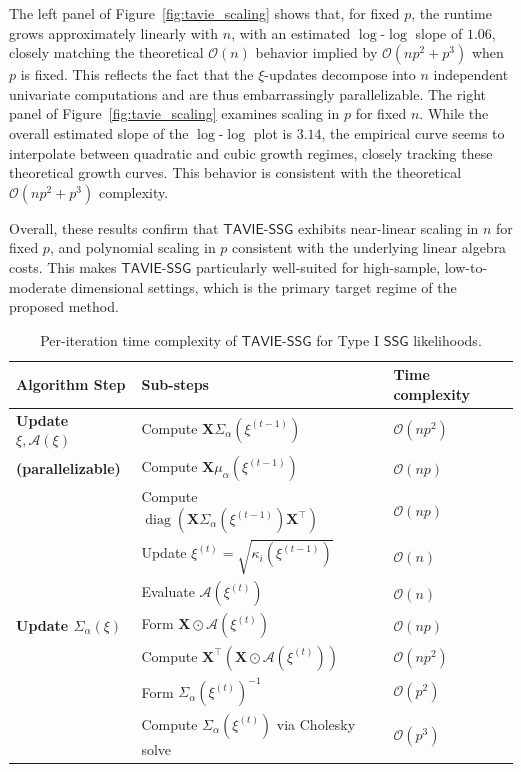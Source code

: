 \documentclass[12pt]{article}
\numberwithin{equation}{section}
\newcommand{\ssg}{\mathsf{SSG}}
\newcommand{\tssg}{\mathsf{TAVIE}\text{-}\mathsf{SSG}}
\begin{document}
{The left panel of Figure~\ref{fig:tavie_scaling} shows that, for fixed $p$, the runtime grows approximately linearly with $n$, with an estimated $\log$-$\log$ slope of $1.06$, closely matching the theoretical $\mathcal{O}(n)$ behavior implied by $\mathcal{O}(np^2 + p^3)$ when $p$ is fixed. This reflects the fact that the $\xi$-updates decompose into $n$ independent univariate computations and are thus embarrassingly parallelizable. The right panel of Figure~\ref{fig:tavie_scaling} examines scaling in $p$ for fixed $n$. While the overall estimated slope of the $\log$-$\log$ plot is $3.14$, the empirical curve seems to interpolate between quadratic and cubic growth regimes, closely tracking these theoretical growth curves. This behavior is consistent with the theoretical $\mathcal{O}(np^2 + p^3)$ complexity.

Overall, these results confirm that $\tssg$ exhibits near-linear scaling in $n$ for fixed $p$, and polynomial scaling in $p$ consistent with the underlying linear algebra costs. This makes $\tssg$ particularly well-suited for high-sample, low-to-moderate dimensional settings, which is the primary target regime of the proposed method.

\begin{table}[H]
\centering
\caption{\footnotesize{Per-iteration time complexity of $\tssg$ for Type I $\ssg$ likelihoods.}}
\label{tab:type-1-time-complexity}
\footnotesize
\renewcommand{\arraystretch}{1.2}
\begin{tabular}{lll}
\toprule
\toprule
\textbf{Algorithm Step} & \textbf{Sub-steps} & \textbf{Time complexity} \\
\midrule

\textbf{Update $\xi,\mathcal{A}(\xi)$ } 
& Compute $\mathbf{X} \Sigma_{\alpha}(\xi^{(t-1)})$ & $\mathcal{O}(np^2)$ \\
\textbf{(parallelizable)}& Compute $\mathbf{X} \mu_{\alpha}(\xi^{(t-1)})$ & $\mathcal{O}(np)$ \\
& Compute $\operatorname{diag}(\mathbf{X} \Sigma_{\alpha}(\xi^{(t-1)}) \mathbf{X}^\top)$ & $\mathcal{O}(np)$ \\
& Update $\xi^{(t)} = \sqrt{\kappa_i(\xi^{(t-1)})}$ & $\mathcal{O}(n)$ \\
& Evaluate $\mathcal{A}(\xi^{(t)})$ & $\mathcal{O}(n)$ \\

\midrule
\textbf{Update $\Sigma_{\alpha}(\xi)$} 
& Form $\mathbf{X} \odot \mathcal{A}(\xi^{(t)})$ & $\mathcal{O}(np)$ \\
& Compute $\mathbf{X}^\top (\mathbf{X} \odot \mathcal{A}(\xi^{(t)}))$ & $\mathcal{O}(np^2)$ \\
& Form $\Sigma_{\alpha}(\xi^{(t)})^{-1}$ & $\mathcal{O}(p^2)$ \\
& Compute $\Sigma_{\alpha}(\xi^{(t)})$ via Cholesky solve & $\mathcal{O}(p^3)$ \\


\end{tabular}
\end{table}}
\end{document}
